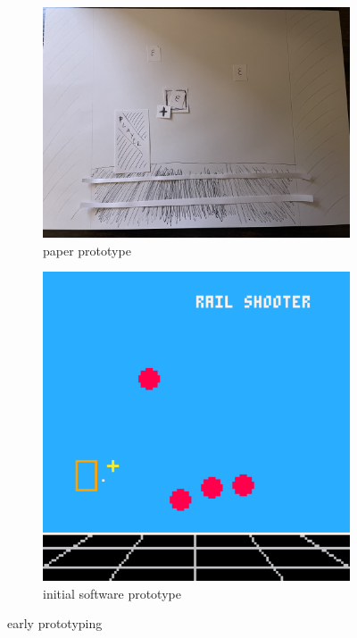 \documentclass[11pt]{article}
\begin{document}
\begin{figure}[h]
\begin{subfigure}{.5\textwidth}
  \centering
  \includegraphics[width=.8\linewidth]{paper_prototype}
  \caption{paper prototype}
  \label{fig:pfig1}
\end{subfigure}
\begin{subfigure}{.5\textwidth}
  \centering
  \includegraphics[width=.8\linewidth]{prototype2d}
  \caption{initial software prototype}
  \label{fig:pfig2}
\end{subfigure}
\caption{early prototyping}
\label{fig:gameprototype}
\end{figure}

\end{document}
